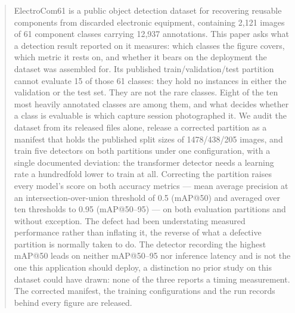 \documentclass[11pt,a4paper]{article}
\begin{document}
\begin{abstract}
ElectroCom61 is a public object detection dataset for recovering reusable
components from discarded electronic equipment, containing 2{,}121 images of 61
component classes carrying 12{,}937 annotations. This paper asks what a detection
result reported on it measures: which classes the figure covers, which metric it
rests on, and whether it bears on the deployment the dataset was assembled for.
Its published train/validation/test partition cannot evaluate 15 of those 61
classes: they hold no instances in either the validation or the test set. They
are not the rare classes. Eight of the ten most
heavily annotated classes are among them, and what decides whether a class is
evaluable is which capture session photographed it. We audit the dataset from
its released files alone, release a corrected partition as a manifest that holds
the published split sizes of 1478/438/205 images, and train five detectors on
both partitions under one configuration, with a single documented deviation: the
transformer detector needs a learning rate a hundredfold lower to train at all.
Correcting the partition raises every model's score on both accuracy metrics ---
mean average precision at an intersection-over-union threshold of 0.5 (mAP@50)
and averaged over ten thresholds to 0.95 (mAP@50--95) --- on both evaluation
partitions and without exception. The defect had been understating measured
performance rather than inflating it, the reverse of what a defective partition
is normally taken to do. The detector recording the highest mAP@50 leads on
neither mAP@50--95 nor inference latency and is not the one this application
should deploy, a distinction no prior study on this dataset could have drawn:
none of the three reports a timing measurement. The corrected manifest, the
training configurations and the run records behind every figure are released.
\end{abstract}















\appendix

\end{document}
